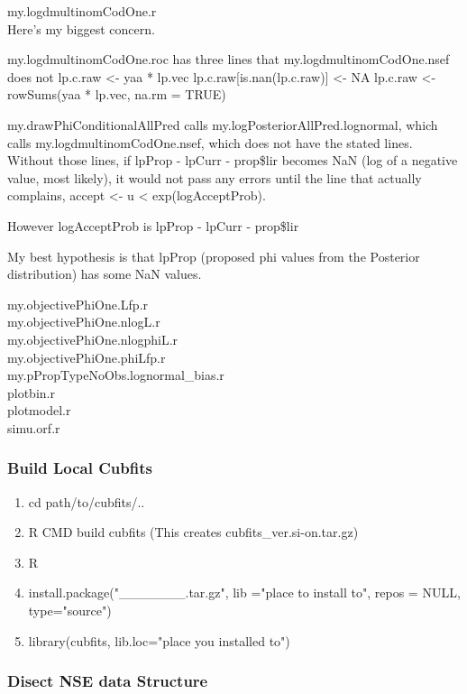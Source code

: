 \documentclass[11pt]{article} %
\begin{document}
my.logdmultinomCodOne.r\\

Here's my biggest concern. 


my.logdmultinomCodOne.roc has three lines that my.logdmultinomCodOne.nsef does not
  lp.c.raw <- yaa * lp.vec
  lp.c.raw[is.nan(lp.c.raw)] <- NA
  lp.c.raw <- rowSums(yaa * lp.vec, na.rm = TRUE)

my.drawPhiConditionalAllPred calls my.logPosteriorAllPred.lognormal, which calls my.logdmultinomCodOne.nsef, which does not have the stated lines. Without those lines, if lpProp - lpCurr - prop\$lir becomes NaN (log of a negative value, most likely), it would not pass any errors until the line that actually complains, accept <- u < exp(logAcceptProb).

However logAcceptProb is lpProp - lpCurr - prop\$lir

My best hypothesis is that lpProp (proposed phi values from the Posterior distribution) has some NaN values.




my.objectivePhiOne.Lfp.r\\
my.objectivePhiOne.nlogL.r\\
my.objectivePhiOne.nlogphiL.r\\
my.objectivePhiOne.phiLfp.r\\
my.pPropTypeNoObs.lognormal\_bias.r\\
plotbin.r\\
plotmodel.r\\
simu.orf.r\\


\subsubsection{Build Local Cubfits}

\begin{enumerate}
\item cd path/to/cubfits/..
\item R CMD build cubfits (This creates cubfits\_ver.si-on.tar.gz)
\item R
\item install.package("\_\_\_\_\_\_\_.tar.gz", lib ="place to install to", repos = NULL, type="source")
\item library(cubfits, lib.loc="place you installed to")
\end{enumerate}


\subsubsection{Disect NSE data Structure}
\end{document}
